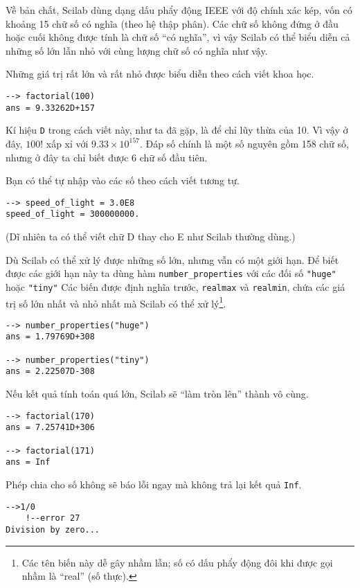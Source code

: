 \documentclass[12pt]{book}
\begin{document}
Về bản chất, Scilab dùng dạng dấu phẩy động IEEE với độ
chính xác kép, vốn có khoảng 15 chữ số có nghĩa (theo hệ thập
phân). Các chữ số không đứng ở đầu hoặc cuối không được
tính là chữ số ``có nghĩa'', vì vậy Scilab có thể biểu diễn cả
những số lớn lẫn nhỏ với cùng lượng chữ số có nghĩa như vậy.

Những giá trị rất lớn và rất nhỏ được biểu diễn theo cách viết
khoa học.

\begin{verbatim}
--> factorial(100)
ans = 9.33262D+157
\end{verbatim}
%
Kí hiệu {\tt D} trong cách viết này, như ta đã gặp, là để chỉ lũy thừa 
của 10. Vì vậy ở đây, 
$100!$ xấp xỉ với $9.33 \times 10^{157}$.  Đáp số chính là một 
số nguyên gồm 158 chữ số, nhưng ở đây ta chỉ biết được 6
chữ số đầu tiên.

Bạn có thể tự nhập vào các số theo cách viết tương tự.

\begin{verbatim}
--> speed_of_light = 3.0E8
speed_of_light = 300000000.
\end{verbatim}
%
(Dĩ nhiên ta có thể viết chữ D thay cho E như Scilab thường dùng.)

Dù Scilab có thể xử lý được những số lớn, nhưng vẫn có một giới hạn.
Để biết được các giới hạn này ta dùng hàm \texttt{number\_properties}
với các đối số \texttt{"huge"} hoặc \texttt{"tiny"}
Các biến được định nghĩa trước, {\tt realmax} và {\tt realmin}, chứa các 
giá trị số lớn nhất và nhỏ nhất mà Scilab có thể xử lý\footnote{Các
tên biến này dễ gây nhầm lẫn; số có dấu phẩy động đôi khi được gọi
nhầm là ``real'' (số thực).}.

\begin{verbatim}
--> number_properties("huge")
ans = 1.79769D+308

--> number_properties("tiny")
ans = 2.22507D-308
\end{verbatim}
%
Nếu kết quả tính toán quá lớn, Scilab sẽ ``làm tròn lên'' thành
vô cùng.

\begin{verbatim}
--> factorial(170)
ans = 7.25741D+306

--> factorial(171)
ans = Inf
\end{verbatim}
%
Phép chia cho số không sẽ báo lỗi ngay mà
không trả lại kết quả {\tt Inf}.

\begin{verbatim}
-->1/0
    !--error 27 
Division by zero...
\end{verbatim}
%
\end{document}
